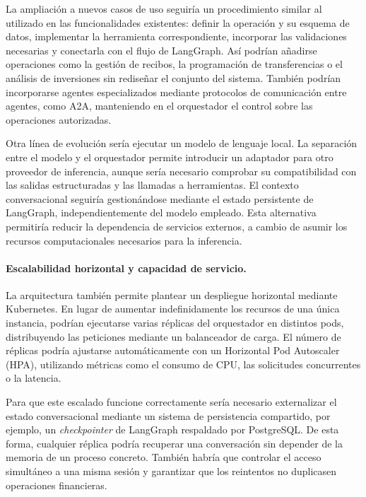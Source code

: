 \documentclass[12pt,a4paper]{article}
\begin{document}
La ampliación a nuevos casos de uso seguiría un procedimiento similar al utilizado en las funcionalidades existentes: definir la operación y su esquema de datos, implementar la herramienta correspondiente, incorporar las validaciones necesarias y conectarla con el flujo de LangGraph. Así podrían añadirse operaciones como la gestión de recibos, la programación de transferencias o el análisis de inversiones sin rediseñar el conjunto del sistema. También podrían incorporarse agentes especializados mediante protocolos de comunicación entre agentes, como A2A, manteniendo en el orquestador el control sobre las operaciones autorizadas.

Otra línea de evolución sería ejecutar un modelo de lenguaje local. La separación entre el modelo y el orquestador permite introducir un adaptador para otro proveedor de inferencia, aunque sería necesario comprobar su compatibilidad con las salidas estructuradas y las llamadas a herramientas. El contexto conversacional seguiría gestionándose mediante el estado persistente de LangGraph, independientemente del modelo empleado. Esta alternativa permitiría reducir la dependencia de servicios externos, a cambio de asumir los recursos computacionales necesarios para la inferencia.

\paragraph{Escalabilidad horizontal y capacidad de servicio.}

La arquitectura también permite plantear un despliegue horizontal mediante Kubernetes. En lugar de aumentar indefinidamente los recursos de una única instancia, podrían ejecutarse varias réplicas del orquestador en distintos pods, distribuyendo las peticiones mediante un balanceador de carga. El número de réplicas podría ajustarse automáticamente con un Horizontal Pod Autoscaler (HPA), utilizando métricas como el consumo de CPU, las solicitudes concurrentes o la latencia.

Para que este escalado funcione correctamente sería necesario externalizar el estado conversacional mediante un sistema de persistencia compartido, por ejemplo, un \textit{checkpointer} de LangGraph respaldado por PostgreSQL. De esta forma, cualquier réplica podría recuperar una conversación sin depender de la memoria de un proceso concreto. También habría que controlar el acceso simultáneo a una misma sesión y garantizar que los reintentos no duplicasen operaciones financieras.
\end{document}
